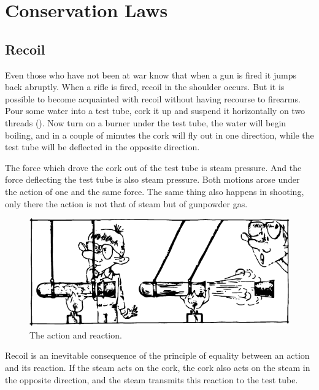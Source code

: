 

\cleardoublepage
\chapter{ Conservation Laws}
\section{Recoil}
Even those who have not been at war know that when
a gun is fired it jumps back abruptly. When a rifle is
fired, recoil in the shoulder occurs. But it is possible
to become acquainted with recoil without having recourse
to firearms. Pour some water into a test tube, cork it up
and suspend it horizontally on two threads ().
Now turn on a burner under the test tube, the water will
begin boiling, and in a couple of minutes the cork will
fly out in one direction, while the test tube will be deflected in the opposite direction.

The force which drove the cork out of the test tube is
steam pressure. And the force deflecting the test tube is
also steam pressure. Both motions arose under the action
of one and the same force. The same thing also happens in
shooting, only there the action is not that of steam but
of gunpowder gas.
\begin{figure}[!ht]
\centering
\includegraphics[width=\textwidth]{figures/fig-03-01.pdf}
\caption{The action and reaction.}
\label{fig-3.01}
\end{figure}

Recoil is an inevitable consequence of the principle
of equality between an action and its reaction. If the
steam acts on the cork, the cork also acts on the steam
in the opposite direction, and the steam transmits this
reaction to the test tube.

